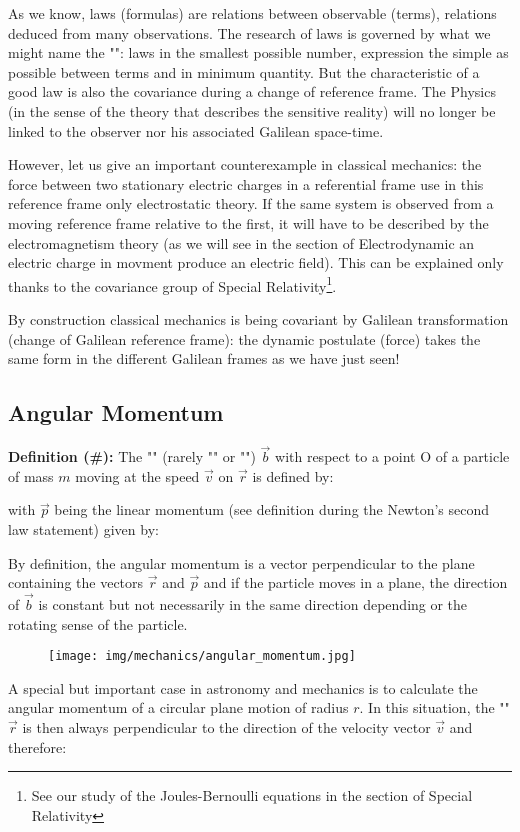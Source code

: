 	As we know, laws (formulas) are relations between observable (terms), relations deduced from many observations. The research of laws is governed by what we might name the "": laws in the smallest possible number, expression the simple as possible between terms and in minimum quantity. But the characteristic of a good law is also the covariance during a change of reference frame. The Physics (in the sense of the theory that describes the sensitive reality) will no longer be linked to the observer nor his associated Galilean space-time.
	
	However, let us give an important counterexample in classical mechanics: the force between two stationary electric charges in a referential frame use in this reference frame only electrostatic theory. If the same system is observed from a moving reference  frame relative to the first, it will have to be described by the electromagnetism theory (as we will see in the section of Electrodynamic an electric charge in movment produce an electric field). This can be explained only thanks to the covariance group of Special Relativity\footnote{See our study of the Joules-Bernoulli equations in the section of Special Relativity}.

	By construction classical mechanics is being covariant by Galilean transformation (change of Galilean reference frame): the dynamic postulate (force) takes the same form in the different Galilean frames as we have just seen!
	
	\pagebreak
	\subsection{Angular Momentum}
	\textbf{Definition (\#\mydef):} The "" (rarely "" or "") $\vec{b}$ with respect to a point O of a particle of mass $m$ moving at the speed $\vec{v}$ on $\vec{r}$ is defined by:	
	
	with $\vec{p}$ being the linear momentum (see definition during the Newton's second law statement) given by:
	
	By definition, the angular momentum is a vector perpendicular to the plane containing the vectors $\vec{r}$ and $\vec{p}$ and if the particle moves in a plane, the direction of $\vec{b}$ is constant but not necessarily in the same direction depending or the rotating sense of the particle.
	\begin{figure}[H]
		\centering
		\texttt{[image: img/mechanics/angular\_momentum.jpg]}
	\end{figure}
	A special but important case in astronomy and mechanics is to calculate the angular momentum of a circular plane motion of radius $r$. In this situation, the "" $\vec{r}$ is then always perpendicular to the direction of the velocity vector $\vec{v}$ and therefore:
	
